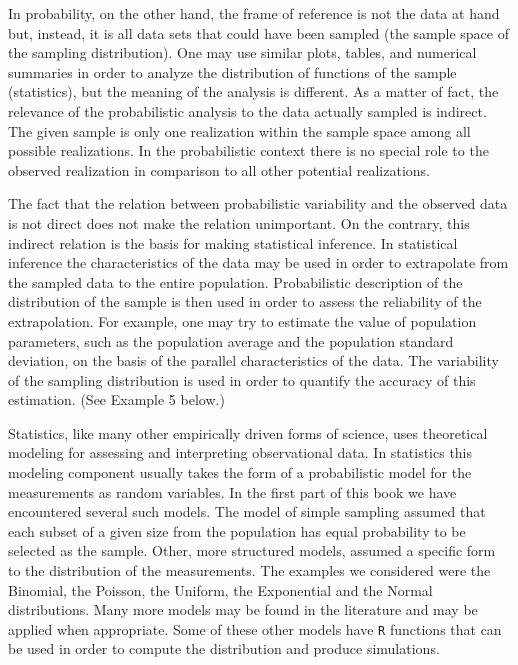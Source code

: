 \documentclass[
]{krantz}
\theoremstyle{definition}
\theoremstyle{definition}
\theoremstyle{definition}
\theoremstyle{remark}
\begin{document}
In probability, on the other hand, the frame of reference is not the
data at hand but, instead, it is all data sets that could have been
sampled (the sample space of the sampling distribution). One may use
similar plots, tables, and numerical summaries in order to analyze the
distribution of functions of the sample (statistics), but the meaning of
the analysis is different. As a matter of fact, the relevance of the
probabilistic analysis to the data actually sampled is indirect. The
given sample is only one realization within the sample space among all
possible realizations. In the probabilistic context there is no special
role to the observed realization in comparison to all other potential
realizations.

The fact that the relation between probabilistic variability and the
observed data is not direct does not make the relation unimportant. On
the contrary, this indirect relation is the basis for making statistical
inference. In statistical inference the characteristics of the data may
be used in order to extrapolate from the sampled data to the entire
population. Probabilistic description of the distribution of the sample
is then used in order to assess the reliability of the extrapolation.
For example, one may try to estimate the value of population parameters,
such as the population average and the population standard deviation, on
the basis of the parallel characteristics of the data. The variability
of the sampling distribution is used in order to quantify the accuracy
of this estimation. (See Example 5 below.)

Statistics, like many other empirically driven forms of science, uses
theoretical modeling for assessing and interpreting observational data.
In statistics this modeling component usually takes the form of a
probabilistic model for the measurements as random variables. In the
first part of this book we have encountered several such models. The
model of simple sampling assumed that each subset of a given size from
the population has equal probability to be selected as the sample.
Other, more structured models, assumed a specific form to the
distribution of the measurements. The examples we considered were the
Binomial, the Poisson, the Uniform, the Exponential and the Normal
distributions. Many more models may be found in the literature and may
be applied when appropriate. Some of these other models have \texttt{R}
functions that can be used in order to compute the distribution and
produce simulations.
\end{document}
